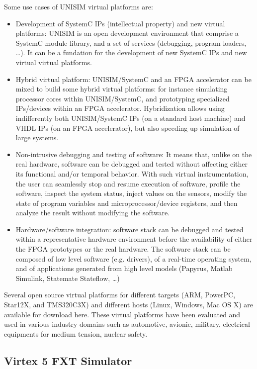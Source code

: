 \noindent Some use cases of UNISIM virtual platforms are:
\begin{itemize}
\item Development of SystemC IPs (intellectual property) and new virtual platforms: UNISIM is an open development environment that comprise a SystemC module library, and a set of services (debugging, program loaders, …). It can be a fundation for the development of new SystemC IPs and new virtual virtual platforms.
\item Hybrid virtual platform: UNISIM/SystemC and an FPGA accelerator can be mixed to build some hybrid virtual platforms: for instance simulating processor cores within UNISIM/SystemC, and prototyping specialized IPs/devices within an FPGA accelerator. Hybridization allows using indifferently both UNISIM/SystemC IPs (on a standard host machine) and VHDL IPs (on an FPGA accelerator), but also speeding up simulation of large systems.
\item Non-intrusive debugging and testing of software: It means that, unlike on the real hardware, software can be debugged and tested without affecting either its functional and/or temporal behavior.
With such virtual instrumentation, the user can seamlessly stop and resume execution of software, profile the software, inspect the system status, inject values on the sensors, modify the state of program variables and microprocessor/device registers, and then analyze the result without modifying the software.
\item Hardware/software integration: software stack can be debugged and tested within a representative hardware environment before the availability of either the FPGA prototypes or the real hardware.
The software stack can be composed of low level software (e.g. drivers), of a real-time operating system, and of applications generated from high level models (Papyrus, Matlab Simulink, Statemate Stateflow, …)
\end{itemize}

Several open source virtual platforms for different targets (ARM, PowerPC, Star12X, and TMS320C3X) and different hosts (Linux, Windows, Mac OS X) are available for download here.
These virtual platforms have been evaluated and used in various industry domains such as automotive, avionic, military, electrical equipments for medium tension, nuclear safety.

\subsection{Virtex 5 FXT Simulator}

